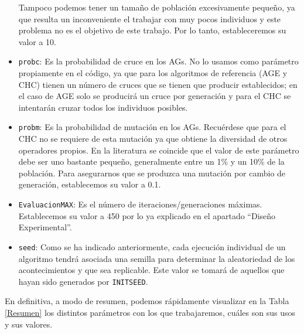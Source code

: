\begin{itemize}
	Tampoco podemos tener un tamaño de población excesivamente pequeño, ya que resulta un inconveniente el trabajar con muy pocos individuos y este problema no es el objetivo de este trabajo. 
	Por lo tanto, estableceremos su valor a 10.
	\item \texttt{probc}: Es la probabilidad de cruce en los AGs. 
	No lo usamos como parámetro propiamente en el código, ya que para los algoritmos de referencia (AGE y CHC) tienen un número de cruces que se tienen que producir establecidos; en el caso de AGE solo se producirá un cruce por generación y para el CHC se intentarán cruzar todos los individuos posibles. 
	\item \texttt{probm}: Es la probabilidad de mutación en los AGs. Recuérdese que para el CHC no se requiere de esta mutación ya que obtiene la diversidad de otros operadores propios. 
	En la literatura se coincide que el valor de este parámetro debe ser uno bastante pequeño, generalmente entre un 1\% y un 10\% de la población. 
	Para asegurarnos que se produzca una mutación por cambio de generación, establecemos su valor a 0.1.
	\item \texttt{EvaluacionMAX}: Es el número de iteraciones/generaciones máximas. 
	Establecemos su valor a 450 por lo ya explicado en el apartado ``Diseño Experimental''.
	\item \texttt{seed}: Como se ha indicado anteriormente, cada ejecución individual de un algoritmo tendrá asociada una semilla para determinar la aleatoriedad de los acontecimientos y que sea replicable. 
	Este valor se tomará de aquellos que hayan sido generados por \texttt{INITSEED}.
\end{itemize}

En definitiva, a modo de resumen, podemos rápidamente visualizar en la Tabla \ref{Resumen} los distintos parámetros con los que trabajaremos, cuáles son sus usos y sus valores.

